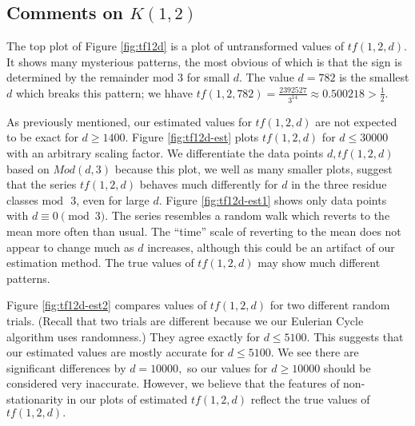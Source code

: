 \documentclass[11pt]{amsart} %
\begin{document}
\subsection{Comments on $K(1,2)$}
 The top plot of Figure \ref{fig:tf12d} is a plot of untransformed values of $tf(1,2,d)$. It shows many mysterious patterns, the most obvious of which is that the sign is determined by the remainder $\text{mod }3$ for small $d.$ The value $d = 782$ is the smallest $d$ which breaks this pattern; we hhave $tf(1,2,782) = \frac{2392527}{3^{14}}  \approx 0.500218 > \frac{1}{2}.$

As previously mentioned, our estimated values for $tf(1,2,d)$ are not expected to be exact for $d \ge 1400.$ %
Figure \ref{fig:tf12d-est} plots $tf(1,2,d)$ for $d \le 30000$ with an arbitrary scaling factor. We differentiate the data points $d, tf(1,2,d)$ based on $Mod(d,3)$ because this plot, we well as many smaller plots, suggest that the series $tf(1,2,d)$ behaves much differently for $d$ in the three residue classes $\text{mod }$ 3, even for large $d.$ Figure \ref{fig:tf12d-est1} shows only data points with $d \equiv 0 \pmod{3}.$ The series resembles a random walk which reverts to the mean more often than usual. The ``time'' scale of reverting to the mean does not appear to change much as $d$ increases, although this could be an artifact of our estimation method. The true values of $tf(1,2,d)$ may show much different patterns.

Figure \ref{fig:tf12d-est2} compares values of $tf(1,2,d)$ for two different random trials.  (Recall that two trials are different because we our Eulerian Cycle algorithm uses randomness.) They agree exactly for $d \le 5100.$ This suggests that our estimated values are mostly accurate for $d \le 5100.$ We see there are significant differences by $d = 10000,$ so our values for $d \ge 10000$ should be considered very inaccurate. However, we believe that the features of non-stationarity in our plots of estimated $tf(1,2,d)$ reflect the true values of $tf(1,2,d).$
\end{document}
